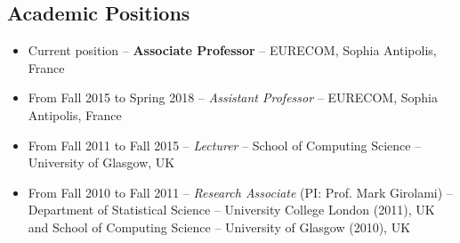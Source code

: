 \documentclass[a4paper,10pt]{article}
\begin{document}
	 

\subsection*{Academic Positions}

	
                          
\begin{itemize}
\item Current position -- {\bf Associate Professor} -- %
EURECOM, Sophia Antipolis, France %




\item From Fall 2015 to Spring 2018 -- {\em Assistant Professor} -- %
  EURECOM, Sophia Antipolis, France %

\item From Fall 2011 to Fall 2015 -- {\em Lecturer} -- %
  School of Computing Science -- University of Glasgow, UK %

\item From Fall 2010 to Fall 2011 -- {\em Research Associate} (PI: Prof. Mark Girolami) -- %
  Department of Statistical Science -- University College London (2011), UK and %
  School of Computing Science -- University of Glasgow (2010), UK %
  

\end{itemize}
\end{document}
